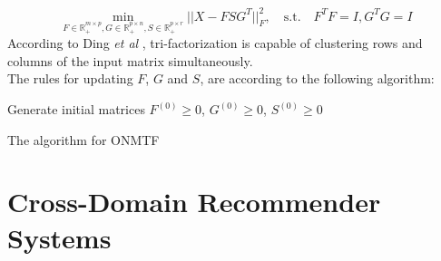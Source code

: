 \begin{equation*}
\min_{F \in \mathbb{R}^{m \times p}_+, G \in \mathbb{R}^{p \times n}_+, S \in \mathbb{R}^{p \times r}_+} ||X - F S G^T||^2_F, \quad \text{s.t.} \quad F^TF = I, G^TG = I
\end{equation*}
According to Ding \textit{et al} \cite{10.1145/1150402.1150420}, tri-factorization is capable of clustering rows and columns of the input matrix simultaneously.\\
The rules for updating $F$, $G$ and $S$, are according to the following algorithm:
\vskip 0.7cm
\begin{algorithm}[H]
Generate initial matrices $F^{(0)} \geq 0$, $G^{(0)} \geq 0$, $S^{(0)} \geq 0$\;
\caption{The algorithm for ONMTF}
\end{algorithm}



\section{Cross-Domain Recommender Systems}

